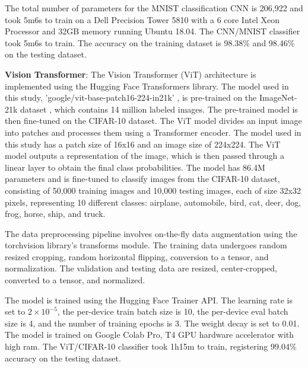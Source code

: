 The total number of parameters for the MNIST classification CNN is 206,922 and took 5m6s to train on a Dell Precision Tower 5810 with a 6 core Intel Xeon Processor and 32GB memory running Ubuntu 18.04.  
The CNN/MNIST classifier took 5m6s to train. The accuracy on the training dataset is 98.38\% and 98.46\% on the testing dataset. 


\textbf{Vision Transformer}: The Vision Transformer (ViT) architecture \cite{dosovitskiy2020image} is implemented using the Hugging Face Transformers \cite{wolf2020huggingfaces}
library. The model used in this study, 'google/vit-base-patch16-224-in21k' \cite{wu2020visual}, is pre-trained on the ImageNet-21k dataset \cite{deng2009imagenet}, which contains 14 million labeled images. The pre-trained model is then fine-tuned on the CIFAR-10 dataset.
The ViT model divides an input image into patches and processes them using a Transformer encoder. The model used in this study has a patch size of 16x16 and an image size of 224x224. The ViT model outputs a representation of the image, which is then passed through a linear layer to obtain the final class probabilities.
The model has 86.4M parameters and is fine-tuned to classify images from the CIFAR-10 dataset, consisting of 50,000 training images and 10,000 testing images, each of size 32x32 pixels, representing 10 different classes: airplane, automobile, bird, cat, deer, dog, frog, horse, ship, and truck.

The data preprocessing pipeline involves on-the-fly data augmentation using the torchvision library's transforms module. The training data undergoes random resized cropping, random horizontal flipping, conversion to a tensor, and normalization. The validation and testing data are resized, center-cropped, converted to a tensor, and normalized.

The model is trained using the Hugging Face Trainer API. The learning rate is set to $2 \times 10^{-5}$, the per-device train batch size is 10, the per-device eval batch size is 4, and the number of training epochs is 3. The weight decay is set to 0.01. The model is trained on Google Colab Pro, T4 GPU hardware accelerator with high ram. The ViT/CIFAR-10 classifier took 1h15m to train, registering 99.04\% accuracy on the testing dataset.


